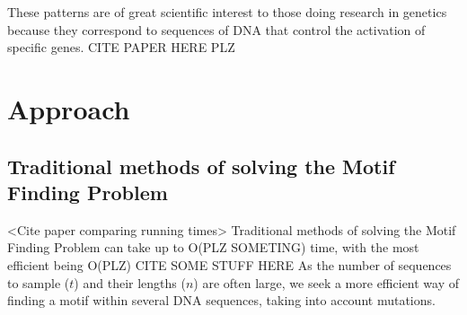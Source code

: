 \documentclass{bioinfo}
\begin{document}
These patterns are of great scientific interest to those doing research in genetics because they correspond to sequences of DNA that control the activation of specific genes. CITE PAPER HERE PLZ

\section{Approach}
\subsection{Traditional methods of solving the Motif Finding Problem}
<Cite paper comparing running times>
Traditional methods of solving the Motif Finding Problem can take up to O(PLZ SOMETING) time, with the most efficient being O(PLZ) CITE SOME STUFF HERE As the number of sequences to sample ($t$) and their lengths ($n$) are often large, we seek a more efficient way of finding a motif within several DNA sequences, taking into account mutations. 
\end{document}
